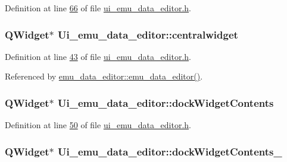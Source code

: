 Definition at line \hyperlink{a00051_source_l00066}{66} of file \hyperlink{a00051_source}{ui\+\_\+emu\+\_\+data\+\_\+editor.\+h}.

\hypertarget{a00026_afff870ab422d2b873976067827089af1}{
\subsubsection[{centralwidget}]{\setlength{\rightskip}{0pt plus 5cm}Q\+Widget$\ast$ Ui\+\_\+emu\+\_\+data\+\_\+editor\+::centralwidget}}\label{a00026_afff870ab422d2b873976067827089af1}


Definition at line \hyperlink{a00051_source_l00043}{43} of file \hyperlink{a00051_source}{ui\+\_\+emu\+\_\+data\+\_\+editor.\+h}.



Referenced by \hyperlink{a00035_source_l00012}{emu\+\_\+data\+\_\+editor\+::emu\+\_\+data\+\_\+editor()}.

\hypertarget{a00026_a78f9e81c1adc0092b7e4d6efb640dc43}{
\subsubsection[{dock\+Widget\+Contents}]{\setlength{\rightskip}{0pt plus 5cm}Q\+Widget$\ast$ Ui\+\_\+emu\+\_\+data\+\_\+editor\+::dock\+Widget\+Contents}}\label{a00026_a78f9e81c1adc0092b7e4d6efb640dc43}


Definition at line \hyperlink{a00051_source_l00050}{50} of file \hyperlink{a00051_source}{ui\+\_\+emu\+\_\+data\+\_\+editor.\+h}.

\hypertarget{a00026_ae304b249d83cb3152fbbf7a7d7e0e29b}{
\subsubsection[{dock\+Widget\+Contents\+\_\+2}]{\setlength{\rightskip}{0pt plus 5cm}Q\+Widget$\ast$ Ui\+\_\+emu\+\_\+data\+\_\+editor\+::dock\+Widget\+Contents\+\_}}\label{a00026_ae304b249d83cb3152fbbf7a7d7e0e29b}


